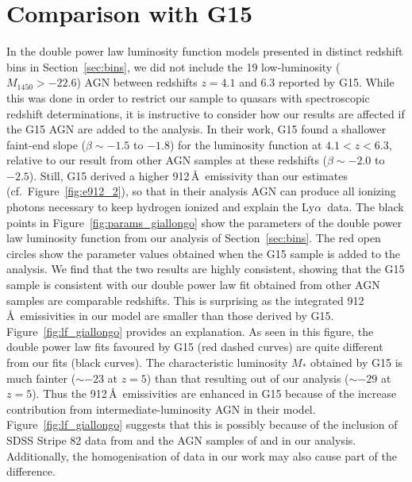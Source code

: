 \documentclass[fleqn,usenatbib]{mnras}
\def\lya{Ly$\alpha$~}
\begin{document}
      \section{Comparison with G15}
      \label{sec:conv}
      In the double power law luminosity function models presented in
      distinct redshift bins in Section~\ref{sec:bins}, we did not include
      the 19 low-luminosity ($M_{1450}>-22.6$) AGN between redshifts $z=4.1$
      and $6.3$ reported by G15.  While this was done in order to restrict
      our sample to quasars with spectroscopic redshift determinations, it
      is instructive to consider how our results are affected if the G15 AGN
      are added to the analysis.  In their work, G15 found a shallower
      faint-end slope ($\beta\sim -1.5$ to $-1.8$) for the luminosity
      function at $4.1 < z < 6.3$, relative to our result from other AGN
      samples at these redshifts ($\beta\sim -2.0$ to $-2.5$).  Still, G15
      derived a higher 912\,\AA\ emissivity than our estimates
      (cf.\ Figure~\ref{fig:e912_2}), so that in their analysis AGN can
      produce all ionizing photons necessary to keep hydrogen ionized and
      explain the \lya data.  The black points in
      Figure~\ref{fig:params_giallongo} show the parameters of the double
      power law luminosity function from our analysis of
      Section~\ref{sec:bins}.  The red open circles show the parameter
      values obtained when the G15 sample is added to the analysis.  We find
      that the two results are highly consistent, showing that the G15
      sample is consistent with our double power law fit obtained from other
      AGN samples are comparable redshifts.  This is surprising as the
      integrated 912\,\AA\ emissivities in our model are smaller than those
      derived by G15.  Figure~\ref{fig:lf_giallongo} provides an
      explanation.  As seen in this figure, the double power law fits
      favoured by G15 (red dashed curves) are quite different from our fits
      (black curves).  The characteristic luminosity $M_*$ obtained by G15
      is much fainter ($\sim -23$ at $z = 5$) than that resulting out of our
      analysis ($\sim -29$ at $z = 5$).  Thus the 912\,\AA\ emissivities are
      enhanced in G15 because of the increase contribution from
      intermediate-luminosity AGN in their model.
      Figure~\ref{fig:lf_giallongo} suggests that this is possibly because
      of the inclusion of SDSS Stripe 82 data from
      \citet{2013ApJ...768..105M} and the AGN samples of
      \citet{2010AJ....139..906W} and \citet{2015ApJ...798...28K} in our
      analysis.  Additionally, the homogenisation of data in our work may
      also cause part of the difference.
\end{document}
